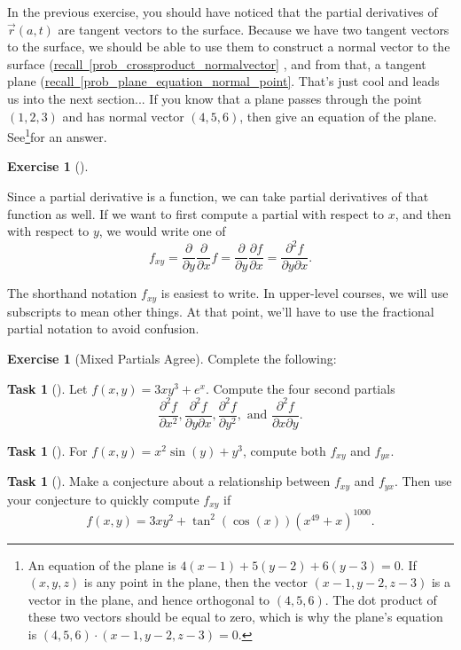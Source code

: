 \documentclass[10pt,]{book}
\theoremstyle{plain}
\theoremstyle{definition}
\theoremstyle{definition}
\theoremstyle{definition}
\theoremstyle{definition}
\newtheorem{exploration}[project]{Exercise}
\newtheorem{task}[project]{Task}
\theoremstyle{definition}
\numberwithin{equation}{section}
\newcommand{\ds}{\displaystyle}
\begin{document}
In the previous exercise, you should have noticed that the partial derivatives of \(\vec r(a,t)\) are tangent vectors to the surface. Because we have two tangent vectors to the surface, we should be able to use them to construct a normal vector to the surface (\hyperref[prob_crossproduct_normalvector]{recall~\ref{prob_crossproduct_normalvector}} , and from that, a tangent plane (\hyperref[prob_plane_equation_normal_point]{recall~\ref{prob_plane_equation_normal_point}}. That's just cool and leads us into the next section...%
If you know that a plane passes through the point \((1,2,3)\) and has normal vector \((4,5,6)\), then give an equation of the plane. See\footnote{An equation of the plane is \(4(x-1)+5(y-2)+6(y-3)=0\). If \((x,y,z)\) is any point in the plane, then the vector \((x-1,y-2,z-3)\) is a vector in the plane, and hence orthogonal to \((4,5,6)\). The dot product of these two vectors should be equal to zero, which is why the plane's equation is \((4,5,6)\cdot (x-1,y-2,z-3)=0\).\label{fn-2}}for an answer.%
\begin{exploration}[]\label{exploration-141}
\end{exploration}
Since a partial derivative is a function, we can take partial derivatives of that function as well. If we want to first compute a partial with respect to \(x\), and then with respect to \(y\), we would write one of%
\begin{equation*}
f_{xy}=\ds\frac{\partial}{\partial y}\frac{\partial}{\partial x}f = \frac{\partial}{\partial y}\frac{\partial f}{\partial x} = \frac{\partial^2 f}{\partial y \partial x}.
\end{equation*}
%
\par
The shorthand notation \(f_{xy}\) is easiest to write. In upper-level courses, we will use subscripts to mean other things. At that point, we'll have to use the fractional partial notation to avoid confusion.%
\begin{exploration}[Mixed Partials Agree]\label{prob_second_partials_agree}
\larsonfive{ } Complete the following:%
\begin{task}[]\label{task-309}
Let \(f(x,y)=3xy^3+e^{x}.\) Compute the four second partials%
\begin{equation*}
\ds \frac{\partial^2 f}{ \partial x^2}, \ds\frac{\partial^2 f}{\partial y \partial x}, \ds\frac{\partial^2 f}{\partial y^2},  \text{ and } \ds\frac{\partial^2 f}{\partial x \partial y}.
\end{equation*}
%
\end{task}
\begin{task}[]\label{task-310}
For \(f(x,y)=x^2\sin(y)+y^3\), compute both \(f_{xy}\) and \(f_{yx}\).%
\end{task}
\begin{task}[]\label{task-311}
Make a conjecture about a relationship between \(f_{xy}\) and \(f_{yx}\). Then use your conjecture to quickly compute \(f_{xy}\) if%
\begin{equation*}
f(x,y)=3xy^2+\tan^{2}(\cos(x)) (x^{49}+x)^{1000}.
\end{equation*}
%
\end{task}
\end{exploration}
\end{document}
